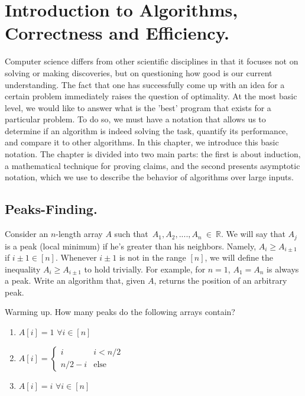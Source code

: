 
\newcommand*{\RECITATION}{}%


\chapter{Introduction to Algorithms, Correctness and Efficiency.}

\ifdefined\RECITATION
\else
Computer science differs from other scientific disciplines in that it focuses not on solving or making discoveries, but on questioning how good is our current understanding. The fact that one has successfully come up with an idea for a certain problem immediately raises the question of optimality. At the most basic level, we would like to answer what is the 'best'  program that exists for a particular problem. To do so, we must have a notation that allows us to determine if an algorithm is indeed solving the task, quantify its performance, and compare it to other algorithms. In this chapter, we introduce this basic notation. The chapter is divided into two main parts: the first is about induction, a mathematical technique for proving claims, and the second presents asymptotic notation, which we use to describe the behavior of algorithms over large inputs.
\fi
\section{Peaks-Finding.}
\begin{example}
Consider an \(n\)-length array $A$ such that~$A_1,A_2,....,A_n~\in~\mathbb{R}$. We will say that $A_{j}$ is a peak (local minimum) if he's greater than his neighbors. Namely, $A_{i} \ge A_{i\pm1}$ if $i\pm 1 \in [n]$. Whenever $i\pm 1$ is not in the range $[n]$, we will define the inequality $A_{i} \ge A_{i\pm 1}$ to hold trivially. For example, for $n=1$, $A_{1}=A_{n}$ is always a peak. Write an algorithm that, given $A$, returns the position of an arbitrary peak.
\end{example}


\begin{example}{Warming up.} \label{example:func} How many peaks do the following arrays contain?
  \begin{enumerate}
    \item $A[i] = 1$   $\forall i \in [n]$
    \item $A[i] = \begin{cases}
        i & i < n/2 \\
        n/2 - i & \text{else}
      \end{cases}$
    \item $A[i] = i $  $\forall i \in [n]$
  \end{enumerate}
\end{example}

